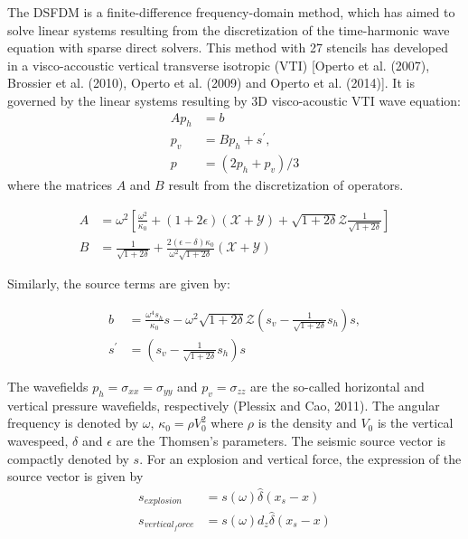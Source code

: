 The DSFDM is a finite-difference frequency-domain method, which has aimed to solve linear systems resulting from the discretization of the time-harmonic wave equation with sparse direct solvers. This method with 27 stencils has developed in a visco-accoustic vertical transverse isotropic (VTI) [Operto et al. (2007), Brossier et al. (2010), Operto et al. (2009) and Operto et al. (2014)]. It is governed by the linear systems resulting by 3D visco-acoustic VTI wave equation:
\begin{align}
Ap_h &= b   \label{eq1}\\
p_v &= Bp_h + s^{'}, \label{eq2}\\
p &= (2p_h + p_v)/3 \label{eq3}
\end{align}
where the matrices $ A $ and $ B $ result from the discretization of operators.

\begin{align}
A &= \omega^{2} \left[ \frac{\omega^{2}}{\kappa_{0}} + (1+2 \epsilon) (\mathcal{X} + \mathcal{Y}) + \sqrt{1+2\delta} \mathcal{Z} \frac{1}{\sqrt{1+2\delta}} \right] \label{eq4}\\
B &= \frac{1}{\sqrt{1+2\delta}} + \frac{2(\epsilon - \delta)\kappa_{0}}{\omega^{2}\sqrt{1+2\delta}} (\mathcal{X} + \mathcal{Y}) 
\end{align}

Similarly, the source terms are given by:

\begin{align}
b &= \frac{\omega^{4}s_{h}}{\kappa_{0}} s - \omega^{2}\sqrt{1+2\delta} \mathcal{Z} \left(s_{v} - \frac{1}{\sqrt{1+2\delta}}s_{h} \right)s, \label{eqb}\\
s^{'} &=  \left(s_{v} - \frac{1}{\sqrt{1+2\delta}}s_{h} \right)s
\end{align}

The wavefields $ p_h = \sigma_{xx} = \sigma_{yy} $ and $ p_v = \sigma_{zz} $ are the so-called horizontal and vertical pressure wavefields, respectively (Plessix and Cao, 2011). The angular frequency is denoted by $ \omega$, $ \kappa_{0} = \rho V_{0}^{2} $  where $ \rho $ is the density and $ V_0 $ is the vertical wavespeed, $ \delta $ and $ \epsilon $ are the Thomsen's parameters. The seismic source vector is compactly denoted by $ s $. For an explosion and vertical force, the expression of the source vector is given by 
\begin{align}
s_{explosion} &= s(\omega) \hat{\delta}(x_s - x) \\
s_{vertical_force} &= s(\omega)d_z \hat{\delta}(x_s - x) 
\end{align}


